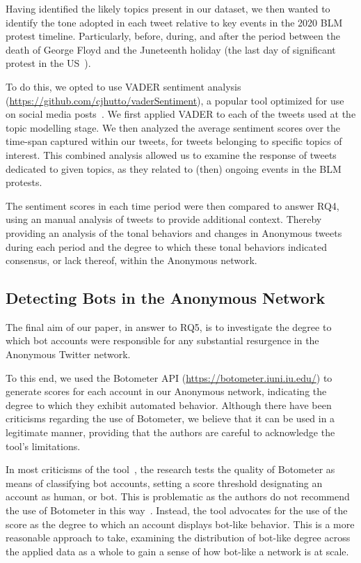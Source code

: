 \documentclass[letterpaper]{article}
\begin{document}
Having identified the likely topics present in our dataset, we then wanted to identify the tone adopted in each tweet relative to key events in the 2020 BLM protest timeline. Particularly, before, during, and after the period between the death of George Floyd and the Juneteenth holiday (the last day of significant protest in the US~\cite{NYT2020}).

To do this, we opted to use VADER sentiment analysis (\url{https://github.com/cjhutto/vaderSentiment}), a popular tool optimized for use on social media posts~\cite{Gilbert2014}. We first applied VADER to each of the tweets used at the topic modelling stage. We then analyzed the average sentiment scores over the time-span captured within our tweets, for tweets belonging to specific topics of interest. This combined analysis allowed us to examine the response of tweets dedicated to given topics, as they related to (then) ongoing events in the BLM protests.

The sentiment scores in each time period were then compared to answer RQ4, using an manual analysis of tweets to provide additional context. Thereby providing an analysis of the tonal behaviors and changes in Anonymous tweets during each period and the degree to which these tonal behaviors indicated consensus, or lack thereof, within the Anonymous network.

\subsection{Detecting Bots in the Anonymous Network}

The final aim of our paper, in answer to RQ5, is to investigate the degree to which bot accounts were responsible for any substantial resurgence in the Anonymous Twitter network.

To this end, we used the Botometer API (\url{https://botometer.iuni.iu.edu/}) to generate scores for each account in our Anonymous network, indicating the degree to which they exhibit automated behavior. Although there have been criticisms regarding the use of Botometer, we believe that it can be used in a legitimate manner, providing that the authors are careful to acknowledge the tool's limitations.

In most criticisms of the tool~\cite{Rauchfleisch2020}, the research tests the quality of Botometer as means of classifying bot accounts, setting a score threshold designating an account as human, or bot. This is problematic as the authors do not recommend the use of Botometer in this way~\cite{Ferrara2020}. Instead, the tool advocates for the use of the score as the degree to which an account displays bot-like behavior. This is a more reasonable approach to take, examining the distribution of bot-like degree across the applied data as a whole to gain a sense of how bot-like a network is at scale.
\end{document}
